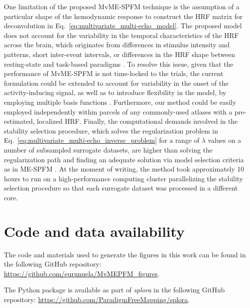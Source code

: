 One limitation of the proposed MvME-SPFM technique is the assumption of a
particular shape of the hemodynamic response to construct the HRF matrix for
deconvolution in Eq.~\eqref{eq:multivariate_multi-echo_model}. The proposed
model does not account for the variability in the temporal characteristics of
the HRF across the brain, which originates from differences in stimulus
intensity and patterns, short inter-event intervals, or differences in the HRF
shape between resting-state and task-based paradigms
\citep{Yesilyurt2008DynamicsnonlinearitiesBOLD,Sadaghiani2009Neuralactivityinduced,Chen2021Investigatingmechanismsfast,Polimeni2021Imagingfasterneural}.
To resolve this issue, given that the performance of MvME-SPFM is not
time-locked to the trials, the current formulation could be extended to account
for variability in the onset of the activity-inducing signal, as well as to
introduce flexibility in the model, by employing multiple basis functions
\citep{Gaudes2012Structuredsparsedeconvolution}. Furthermore, our method could
be easily employed independently within parcels of any commonly-used atlases
with a pre-estimated, localized HRF. Finally, the computational demands involved
in the stability selection procedure, which solves the regularization problem in
Eq.~\eqref{eq:multivariate_multi-echo_inverse_problem} for a range of $\lambda$
values on a number of subsampled surrogate datasets, are higher than solving the
regularization path and finding an adequate solution via model selection
criteria as in ME-SPFM \citep{CaballeroGaudes2019deconvolutionalgorithmmulti}.
At the moment of writing, the method took approximately 10 hours to run on a
high-performance computing cluster parallelizing the stability selection
procedure so that each surrogate dataset was processed in a different core. 

\section{Code and data availability}
\label{sec:multivariate_github}
The code and materials used to generate the figures in this work can be found in
the following GitHub repository:
\url{https://github.com/eurunuela/MvMEPFM_figures}.

The Python package is available as part of \textit{splora} in the following
GitHub repository: \url{https://github.com/ParadigmFreeMapping/splora}.